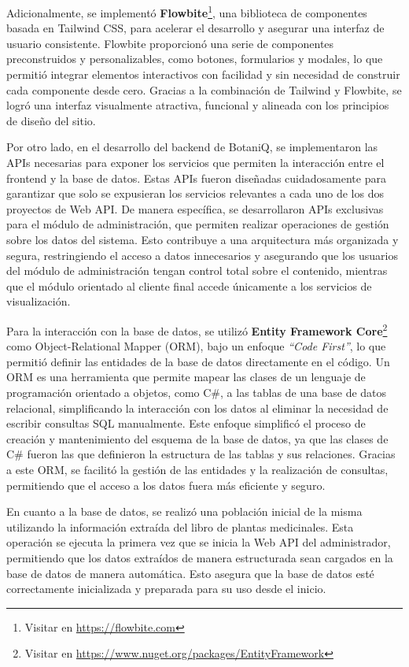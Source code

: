 Adicionalmente, se implementó 
\textbf{Flowbite}\footnote{Visitar en \url{https://flowbite.com}},
una biblioteca de componentes basada en Tailwind CSS, para acelerar el desarrollo y asegurar una interfaz de 
usuario consistente. Flowbite proporcionó una serie de componentes preconstruidos y personalizables, como 
botones, formularios y modales, lo que permitió integrar elementos interactivos con facilidad y sin necesidad 
de construir cada componente desde cero. Gracias a la combinación de Tailwind y Flowbite, se logró una 
interfaz visualmente atractiva, funcional y alineada con los principios de diseño del sitio.

Por otro lado, en el desarrollo del backend de BotaniQ, se implementaron las APIs necesarias para exponer 
los servicios que permiten la interacción entre el frontend y la base de datos. Estas APIs fueron diseñadas 
cuidadosamente para garantizar que solo se expusieran los servicios relevantes a cada uno de los dos proyectos de Web API. 
De manera específica, se desarrollaron APIs exclusivas para el módulo de administración, que permiten realizar operaciones 
de gestión sobre los datos del sistema. Esto contribuye a una arquitectura más organizada y segura, restringiendo el 
acceso a datos innecesarios y asegurando que los usuarios del módulo de administración tengan control total sobre el contenido, 
mientras que el módulo orientado al cliente final accede únicamente a los servicios de visualización.

Para la interacción con la base de datos, se utilizó 
\textbf{Entity Framework Core}\footnote{Visitar en \url{https://www.nuget.org/packages/EntityFramework}} 
como Object-Relational Mapper (ORM),
bajo un enfoque \textit{``Code First''}, lo que permitió definir las entidades de la base de datos directamente 
en el código. 
Un ORM es una herramienta que permite mapear las clases de un lenguaje de programación orientado a objetos, como C\#, 
a las tablas de una base de datos relacional, simplificando la interacción con los datos al eliminar la necesidad de 
escribir consultas SQL manualmente.
Este enfoque simplificó el proceso de creación y mantenimiento del esquema de la base de datos, 
ya que las clases de C\# fueron las que definieron la estructura de las tablas y sus relaciones. Gracias a este ORM, 
se facilitó la gestión de las entidades y la realización de consultas, permitiendo que el acceso a los datos fuera 
más eficiente y seguro.

En cuanto a la base de datos, se realizó una población inicial de la misma utilizando la información extraída del 
libro de plantas medicinales. Esta operación se ejecuta la primera vez que se inicia la Web API del administrador, 
permitiendo que los datos extraídos de manera estructurada sean cargados en la base de datos de manera automática. 
Esto asegura que la base de datos esté correctamente inicializada y preparada para su uso desde el inicio.

